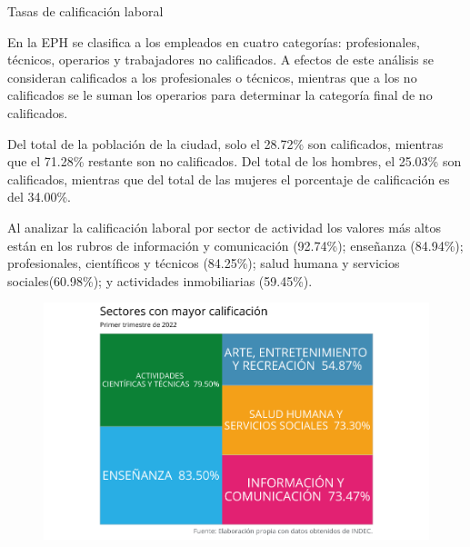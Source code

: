 \documentclass[
]{article}
\begin{document}
\textcolor{graycustom}{\Large Tasas de calificación laboral} \newline

En la EPH se clasifica a los empleados en cuatro categorías:
profesionales, técnicos, operarios y trabajadores no calificados. A
efectos de este análisis se consideran calificados a los profesionales o
técnicos, mientras que a los no calificados se le suman los operarios
para determinar la categoría final de no calificados.

Del total de la población de la ciudad, solo el 28.72\% son calificados,
mientras que el 71.28\% restante son no calificados. Del total de los
hombres, el 25.03\% son calificados, mientras que del total de las
mujeres el porcentaje de calificación es del 34.00\%.

Al analizar la calificación laboral por sector de actividad los valores
más altos están en los rubros de información y comunicación (92.74\%);
enseñanza (84.94\%); profesionales, científicos y técnicos (84.25\%);
salud humana y servicios sociales(60.98\%); y actividades inmobiliarias
(59.45\%).

\begin{figure}[htp]
\includegraphics{Informe-Mercado-Laboral_files/figure-latex/unnamed-chunk-44-1.pdf}
\caption{}
\end{figure}
\end{document}
